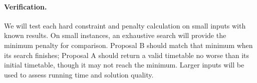\paragraph{Verification.}
We will test each hard constraint and penalty calculation
on small inputs with known results. On small 
instances, an exhaustive search will provide the minimum
penalty for comparison. Proposal B should match that minimum
when its search finishes; Proposal A should return a valid
timetable no worse than its initial timetable, though it may
not reach the minimum. Larger inputs will be used to assess
running time and solution quality.